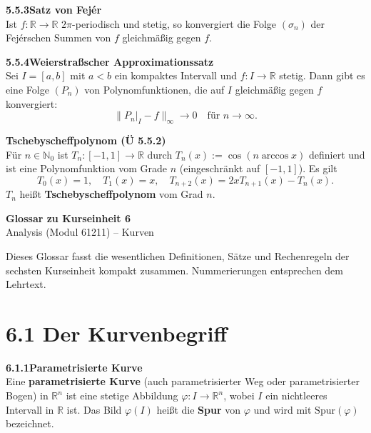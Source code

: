 \documentclass[a4paper,12pt]{article}
\newcommand{\gentry}[3]{%
  \noindent\textbf{#1\quad #2}\nopagebreak\\[0.2em]
  #3\par\smallskip
}
\begin{document}
\gentry{5.5.3}{Satz von Fejér}{%
  Ist $f: \mathbb{R} \to \mathbb{R}$ $2\pi$-periodisch und stetig, so konvergiert
  die Folge $(\sigma_n)$ der Fejérschen Summen von $f$ gleichmäßig gegen $f$.
}

\gentry{5.5.4}{Weierstraßscher Approximationssatz}{%
  Sei $I = [a,b]$ mit $a<b$ ein kompaktes Intervall und $f: I \to \mathbb{R}$
  stetig. Dann gibt es eine Folge $(P_n)$ von Polynomfunktionen, die auf $I$
  gleichmäßig gegen $f$ konvergiert:
  \[
    \|P_n|_I - f\|_\infty \to 0 \quad \text{für } n \to \infty.
  \]
}

\gentry{}{Tschebyscheffpolynom (Ü 5.5.2)}{%
  Für $n \in \mathbb{N}_0$ ist $T_n: [-1,1] \to \mathbb{R}$ durch
  $T_n(x) := \cos(n \arccos x)$ definiert und ist eine Polynomfunktion vom
  Grade $n$ (eingeschränkt auf $[-1,1]$). Es gilt
  \[
    T_0(x) = 1, \quad T_1(x) = x, \quad T_{n+2}(x) = 2 x T_{n+1}(x) - T_n(x).
  \]
  $T_n$ heißt \textbf{Tschebyscheffpolynom} vom Grad $n$.
}

\newpage

\begin{center}
  {\LARGE\bfseries Glossar zu Kurseinheit 6}\\[0.5em]
  {\large Analysis (Modul 61211) -- Kurven}
\end{center}

\vspace{1em}

Dieses Glossar fasst die wesentlichen Definitionen, Sätze und Rechenregeln der
sechsten Kurseinheit kompakt zusammen. Nummerierungen entsprechen dem Lehrtext.

\section*{6.1 \quad Der Kurvenbegriff}

\gentry{6.1.1}{Parametrisierte Kurve}{%
  Eine \textbf{parametrisierte Kurve} (auch parametrisierter Weg oder parametrisierter
  Bogen) in $\mathbb{R}^n$ ist eine stetige Abbildung $\varphi : I \longrightarrow \mathbb{R}^n$,
  wobei $I$ ein nichtleeres Intervall in $\mathbb{R}$ ist. Das Bild $\varphi(I)$ heißt die
  \textbf{Spur} von $\varphi$ und wird mit $\mathrm{Spur}(\varphi)$ bezeichnet.
}
\end{document}
